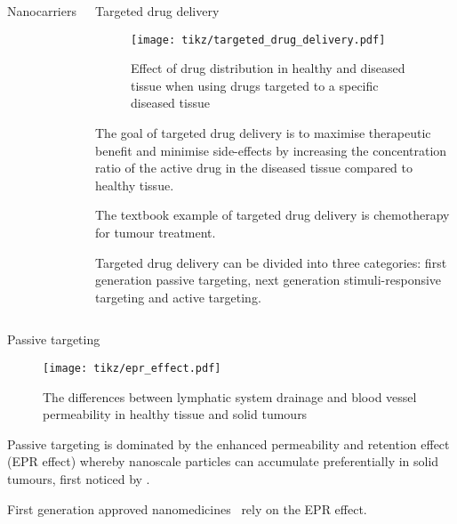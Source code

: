 \documentclass[final]{beamer}
\begin{document}
\begin{frame}[plain]
\begin{columns}[t,onlytextwidth]
\begin{block}{Nanocarriers\strut}
\begin{multicols}{2}
        \end{multicols}
        \vspace{2.5ex}
      \end{block}

      \begin{block}{Targeted drug delivery\strut}

        \begin{figure}
          \centering
          \texttt{[image: tikz/targeted\_drug\_delivery.pdf]}
          \caption{Effect of drug distribution in healthy and diseased tissue when using drugs targeted to a specific diseased tissue}
        \end{figure}

        The goal of targeted drug delivery is to \alert{maximise therapeutic benefit} and \alert{minimise side-effects} by increasing the concentration ratio of the active drug in the diseased tissue compared to healthy tissue.

        The textbook example of targeted drug delivery is chemotherapy for tumour treatment.

        Targeted drug delivery can be divided into three categories: first generation \alert{passive targeting}, next generation \alert{stimuli-responsive targeting} and \alert{active targeting}.

      \end{block}

  \end{columns}

  \begin{columns}[t,onlytextwidth]
      \begin{block}{Passive targeting\strut}

        \begin{figure}
          \centering
          \texttt{[image: tikz/epr\_effect.pdf]}
          \caption{The differences between \textcolor{gold-palatinate}{lymphatic system} drainage and \textcolor{red!80}{blood vessel} permeability in healthy tissue and solid tumours}
          \label{fig:epr}
        \end{figure}

        Passive targeting is dominated by the \alert{enhanced permeability and retention effect} (EPR effect) whereby nanoscale particles can accumulate preferentially in solid tumours, first noticed by \textcite{maeda2000tumor}.

        First generation approved nanomedicines~\cite{wicki2015nanomedicine} rely on the EPR effect.
        

\end{block}
\end{columns}
\end{frame}
\end{document}
